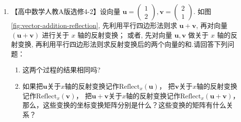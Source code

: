 \begin{exercise}

  \begin{enumerate}
    \item   【高中数学人教A版选修4-2】设向量 $\boldsymbol{u}=\left(\begin{array}{l}1 \\ 2\end{array}\right), \boldsymbol{v}=\left(\begin{array}{l}2 \\ 1\end{array}\right)$. 
            如图 \ref{fig:vector-addition-reflection}, 先利用平行四边形法则求 $\boldsymbol{u}+\boldsymbol{v}$, 再对向量 $(\boldsymbol{u}+\boldsymbol{v})$ 进行关于 $x$ 轴的反射变换；
            或者, 先对向量 $\boldsymbol{u}, \boldsymbol{v}$ 做关于 $x$ 轴的反射变换, 
            再利用平行四边形法则求反射变换后的两个向量的和.请回答下列问题：

            \begin{enumerate}
              \item 这两个过程的结果相同吗?
              \item 如果把$\boldsymbol{u}$关于$x$轴的反射变换记作$\text{Reflect}_{x}(\boldsymbol{u})$，
              把$\boldsymbol{v}$关于$x$轴的反射变换记作$\text{Reflect}_{x}(\boldsymbol{v})$，
              把$\boldsymbol{u}+\boldsymbol{v}$关于$x$轴的反射变换记作$\text{Reflect}_{x}(\boldsymbol{u}+\boldsymbol{v})$，
              那么，这些变换的坐标变换矩阵分别是什么？这些变换的矩阵有什么关系？
            \end{enumerate}

            \begin{figure}[!h]
            \centering
\end{figure}
\end{enumerate}
\end{exercise}
